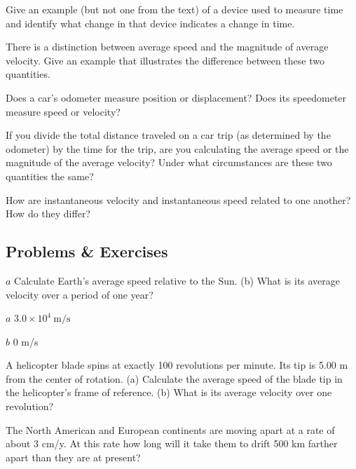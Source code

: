 \documentclass[
]{book}
\begin{document}
\hypertarget{fs-id4081795}{}
\leavevmode{}%
Give an example (but not one from the text) of a device used to measure
time and identify what change in that device indicates a change in time.

\hypertarget{fs-id4059976}{}
\leavevmode{}%
There is a distinction between average speed and the magnitude of
average velocity. Give an example that illustrates the difference
between these two quantities.

\hypertarget{fs-id3539434}{}
\leavevmode{}%
Does a car's odometer measure position or displacement? Does its
speedometer measure speed or velocity?

\hypertarget{fs-id4033346}{}
\leavevmode{}%
If you divide the total distance traveled on a car trip (as determined
by the odometer) by the time for the trip, are you calculating the
average speed or the magnitude of the average velocity? Under what
circumstances are these two quantities the same?

\hypertarget{fs-id1798382}{}
\leavevmode{}%
How are instantaneous velocity and instantaneous speed related to one
another? How do they differ?

\hypertarget{fs-id1644454}{}
\hypertarget{problems-exercises-1}{%
\subsection{Problems \& Exercises}\label{problems-exercises-1}}

\hypertarget{fs-id4131776}{}
\leavevmode{}%
\(a\) Calculate Earth's average speed relative to the Sun. (b) What is
its average velocity over a period of one year?

\leavevmode{}%
\(a\) \({3\text{.}{\text{0} \times \text{10}^{4}\ }\text{m/s}}{}\)

\(b\) 0 m/s

\hypertarget{fs-id3514248}{}
\leavevmode{}%
A helicopter blade spins at exactly 100 revolutions per minute. Its tip
is 5.00 m from the center of rotation. (a) Calculate the average speed
of the blade tip in the helicopter's frame of reference. (b) What is
its average velocity over one revolution?

\hypertarget{fs-id1438634}{}
\leavevmode{}%
The North American and European continents are moving apart at a rate of
about 3 cm/y. At this rate how long will it take them to drift 500 km
farther apart than they are at present?
\end{document}
